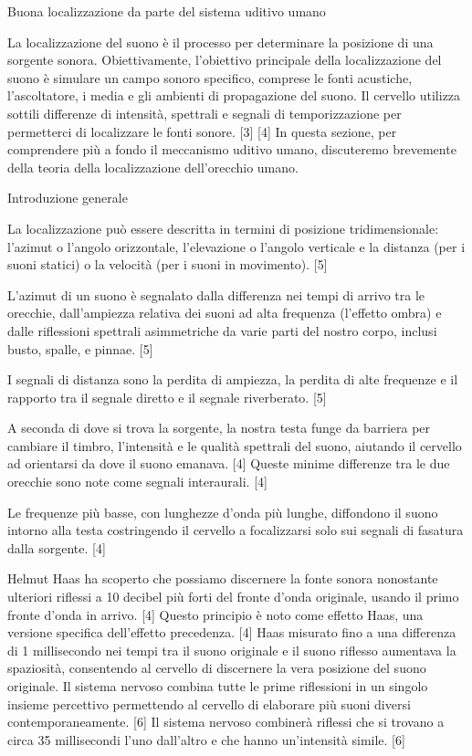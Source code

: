 Buona localizzazione da parte del sistema uditivo umano

La localizzazione del suono è il processo per determinare la posizione di una
sorgente sonora. Obiettivamente, l'obiettivo principale della localizzazione
del suono è simulare un campo sonoro specifico, comprese le fonti acustiche,
l'ascoltatore, i media e gli ambienti di propagazione del suono. Il cervello
utilizza sottili differenze di intensità, spettrali e segnali di temporizzazione
per permetterci di localizzare le fonti sonore. [3] [4] In questa sezione, per
comprendere più a fondo il meccanismo uditivo umano, discuteremo brevemente
della teoria della localizzazione dell'orecchio umano.

Introduzione generale

La localizzazione può essere descritta in termini di posizione tridimensionale:
l'azimut o l'angolo orizzontale, l'elevazione o l'angolo verticale e la distanza
(per i suoni statici) o la velocità (per i suoni in movimento). [5]

L'azimut di un suono è segnalato dalla differenza nei tempi di arrivo tra le
orecchie, dall'ampiezza relativa dei suoni ad alta frequenza (l'effetto ombra)
e dalle riflessioni spettrali asimmetriche da varie parti del nostro corpo,
inclusi busto, spalle, e pinnae. [5]

I segnali di distanza sono la perdita di ampiezza, la perdita di alte frequenze
e il rapporto tra il segnale diretto e il segnale riverberato. [5]

A seconda di dove si trova la sorgente, la nostra testa funge da barriera per
cambiare il timbro, l'intensità e le qualità spettrali del suono, aiutando
il cervello ad orientarsi da dove il suono emanava. [4] Queste minime differenze
tra le due orecchie sono note come segnali interaurali. [4]

Le frequenze più basse, con lunghezze d'onda più lunghe, diffondono il suono
intorno alla testa costringendo il cervello a focalizzarsi solo sui segnali di
fasatura dalla sorgente. [4]

Helmut Haas ha scoperto che possiamo discernere la fonte sonora nonostante
ulteriori riflessi a 10 decibel più forti del fronte d'onda originale, usando
il primo fronte d'onda in arrivo. [4] Questo principio è noto come effetto Haas,
una versione specifica dell'effetto precedenza. [4] Haas misurato fino a una
differenza di 1 millisecondo nei tempi tra il suono originale e il suono riflesso
aumentava la spaziosità, consentendo al cervello di discernere la vera posizione
del suono originale. Il sistema nervoso combina tutte le prime riflessioni in un
singolo insieme percettivo permettendo al cervello di elaborare più suoni diversi
contemporaneamente. [6] Il sistema nervoso combinerà riflessi che si trovano a
circa 35 millisecondi l'uno dall'altro e che hanno un'intensità simile. [6]

